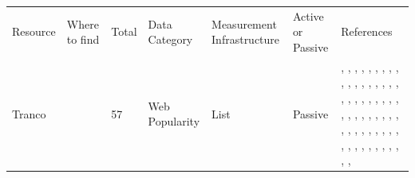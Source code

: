 \begin{table}[h!]
\centering
\begin{tabular}{lllllll}
\hline
Resource & Where to find & Total & Data Category & Measurement Infrastructure & Active or Passive & References \\
Tranco & \cite{10.14722/ndss.2019.23386} & 57 & Web Popularity & List & Passive & \cite{10.1145/3730567.3764500}, \cite{10.1145/3730567.3732921}, \cite{10.1145/3730567.3764490}, \cite{10.1145/3730567.3764501}, \cite{10.1145/3730567.3732913}, \cite{10.1145/3730567.3764507}, \cite{10.1145/3730567.3764427}, \cite{10.1145/3646547.3689014}, \cite{10.1145/3646547.3688410}, \cite{10.1145/3646547.3688449}, \cite{10.1145/3646547.3688444}, \cite{10.1145/3618257.3624821}, \cite{10.1145/3618257.3624844}, \cite{10.1145/3618257.3624835}, \cite{10.1145/3618257.3624842}, \cite{10.1145/3618257.3624795}, \cite{10.1145/3618257.3624817}, \cite{10.1145/3618257.3624797}, \cite{10.1145/3517745.3561457}, \cite{10.1145/3517745.3561445}, \cite{10.1145/3517745.3561437}, \cite{10.1145/3517745.3561415}, \cite{10.1145/3517745.3561446}, \cite{10.1145/3517745.3561453}, \cite{10.1145/3517745.3561444}, \cite{10.1145/3517745.3561460}, \cite{10.1145/3487552.3487843}, \cite{10.1145/3487552.3487857}, \cite{10.1145/3487552.3487850}, \cite{10.1145/3487552.3487855}, \cite{10.1145/3487552.3487836}, \cite{10.1007/978-3-030-72582-2_26}, \cite{10.1007/978-3-030-72582-2_33}, \cite{10.1007/978-3-030-98785-5_19}, \cite{10.1007/978-3-031-28486-1_6}, \cite{10.1007/978-3-031-28486-1_20}, \cite{10.1007/978-3-031-28486-1_26}, \cite{10.1007/978-3-031-56249-5_5}, \cite{10.1007/978-3-031-56249-5_10}, \cite{10.1007/978-3-031-85960-1_3}, \cite{10.1007/978-3-031-85960-1_5}, \cite{10.1007/978-3-031-85960-1_15}, \cite{10.1145/3777912.3809148}, \cite{10.1145/3777912.3809141}, \cite{10.1145/3777912.3839787}, \cite{10.1145/3777912.3839832}, \cite{10.1007/978-3-032-18268-5_1}, \cite{10.1007/978-3-032-18268-5_5}, \cite{10.1007/978-3-032-18268-5_15}, \cite{10.1145/3777912.3839825}, \cite{10.1145/3777912.3839806}, \cite{10.1145/3777912.3839801}, \cite{10.1145/3777912.3839807}, \cite{10.1145/3777912.3809157}, \cite{10.1145/3777912.3839800}, \cite{10.1145/3777912.3839812}, \cite{10.1145/3777912.3809147} \\

\end{tabular}
\end{table}
